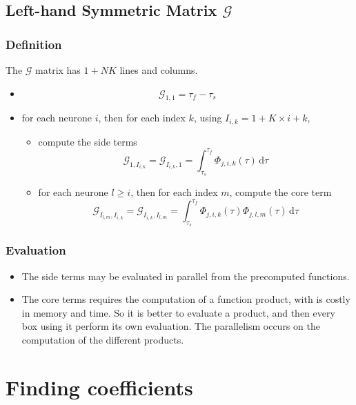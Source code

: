 \documentclass{revtex4}
\begin{document}
\subsection{Left-hand Symmetric Matrix $\mathcal{G}$}
\subsubsection{Definition}
The $\mathcal{G}$ matrix has $1+NK$ lines and columns.
\begin{itemize}
	\item 
		$$ 
		\mathcal{G}_{1,1} = \tau_f-\tau_s
		$$
	\item for each neurone $i$, then for each index $k$, using $I_{i,k}=1+K\times i + k$,
		\begin{itemize}
		\item compute the side terms
		$$
			\mathcal{G}_{1,I_{i,k}} = \mathcal{G}_{I_{i,k},1} = \int_{\tau_s}^{\tau_f} \Phi_{j,i,k}(\tau) \, \mathrm{d}\tau
		$$
		\item for each neurone $l\geq i$, then for each index $m$, compute the core term
		$$
			\mathcal{G}_{I_{l,m},I_{i,k}} = \mathcal{G}_{I_{i,k},I_{l,m}}  =
			\int_{\tau_s}^{\tau_f}  \Phi_{j,i,k}(\tau) \Phi_{j,l,m}(\tau) \, \mathrm{d}\tau
		$$
		\end{itemize}
\end{itemize}

\subsubsection{Evaluation}
\begin{itemize}
\item The side terms may be evaluated in parallel from the precomputed functions.

\item The core terms requires the computation of a function product, with is costly
in memory and time. So it is better to evaluate a product, and then 
every box using it perform its own evaluation.
 The parallelism occurs
on the computation of the different products.
\end{itemize}

\section{Finding coefficients}
\end{document}
